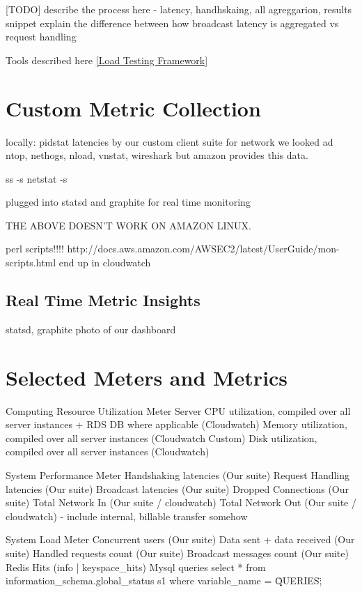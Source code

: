 \documentclass{uvamscse}
\begin{document}
[TODO] describe the process here - latency, handhskaing, all agreggarion, results snippet
explain the difference between how broadcast latency is aggregated vs request handling

Tools described here \ref{Load Testing Framework}

\section{Custom Metric Collection} \label{Custom Metric Collection}

locally:
pidstat
latencies by our custom client suite
for network we looked ad ntop, nethogs, nload, vnstat, wireshark but amazon provides this data.

ss -s
netstat -s

plugged into statsd and graphite for real time monitoring

THE ABOVE DOESN'T WORK ON AMAZON LINUX.

perl scripts!!!!
http://docs.aws.amazon.com/AWSEC2/latest/UserGuide/mon-scripts.html
end up in cloudwatch


\subsection{Real Time Metric Insights} \label{Real Time Metric Insights}
statsd, graphite
photo of our dashboard

\section{Selected Meters and Metrics}\label{Selected Meters and Metrics}
Computing Resource Utilization Meter
Server CPU utilization, compiled over all server instances + RDS DB where applicable (Cloudwatch)
Memory utilization, compiled over all server instances (Cloudwatch Custom)
Disk utilization, compiled over all server instances (Cloudwatch)

System Performance Meter
Handshaking latencies (Our suite)
Request Handling latencies (Our suite)
Broadcast latencies (Our suite)
Dropped Connections (Our suite)
Total Network In (Our suite / cloudwatch)
Total Network Out (Our suite / cloudwatch) - include internal, billable transfer somehow

System Load Meter
Concurrent users  (Our suite)
Data sent + data received  (Our suite)
Handled requests count (Our suite)
Broadcast messages count (Our suite)
Redis Hits (info | keyspace\_hits)
Mysql queries select * from information\_schema.global\_status s1 where variable\_name = \"QUERIES\";
\end{document}
